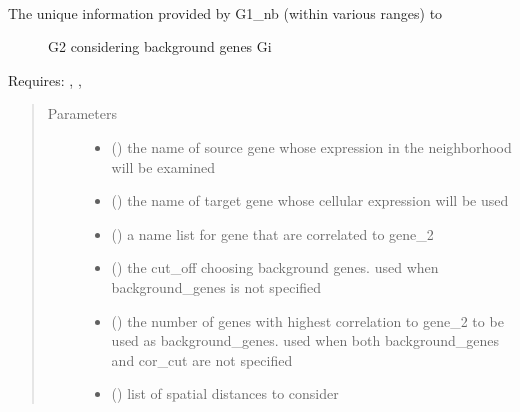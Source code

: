 \documentclass[letterpaper,10pt,english]{sphinxmanual}
\begin{document}
\begin{fulllineitems}
\begin{fulllineitems}
\label{\detokenize{api:spaotsc.SpaOTsc.spatial_sc.gene_pair_pid_effect_range}}~\begin{description}
\item[{The unique information provided by G1\_nb (within various ranges) to}] \leavevmode
G2 considering background genes Gi

\end{description}

Requires: , , 
\begin{quote}\begin{description}
\item[{Parameters}] \leavevmode\begin{itemize}
\item {} 
 () \textendash{} the name of source gene whose expression in the neighborhood will be examined

\item {} 
 () \textendash{} the name of target gene whose cellular expression will be used

\item {} 
 () \textendash{} a name list for gene that are correlated to gene\_2

\item {} 
 () \textendash{} the cut\_off choosing background genes. used when background\_genes is not specified

\item {} 
 () \textendash{} the number of genes with highest correlation to gene\_2 to be used as background\_genes. used when both background\_genes and cor\_cut are not specified

\item {} 
 () \textendash{} list of spatial distances to consider


\end{itemize}
\end{description}
\end{quote}
\end{fulllineitems}
\end{fulllineitems}
\end{document}
